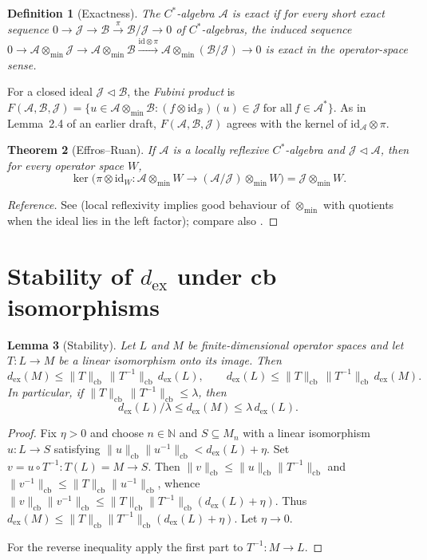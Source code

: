 \documentclass[12pt]{article}
\newtheorem{theorem}{Theorem}[section]
\newtheorem{lemma}[theorem]{Lemma}
\newtheorem{definition}[theorem]{Definition}
\newcommand{\A}{\mathcal A}
\newcommand{\B}{\mathcal B}
\newcommand{\J}{\mathcal J}
\newcommand{\id}{\mathrm{id}}
\newcommand{\otmin}{\otimes_{\min}}
\newcommand{\dex}{d_{\mathrm{ex}}}
\newcommand{\Mn}{M_n}
\begin{document}
\begin{definition}[Exactness]
The $C^*$-algebra $\A$ is \emph{exact} if for every short exact sequence
$0\to \J\to \B\overset{\pi}{\to}\B/\J\to 0$ of $C^*$-algebras, the induced sequence
$0\to \A\otmin\J\to \A\otmin\B\overset{\id\otimes\pi}{\longrightarrow}\A\otmin(\B/\J)\to 0$
is exact in the operator-space sense.
\end{definition}

For a closed ideal $\J\triangleleft \B$, the \emph{Fubini product} is
$F(\A,\B,\J)=\{u\in \A\otmin\B : (f\otimes\id_\B)(u)\in \J\ \text{for all}\ f\in \A^*\}$.
As in Lemma~2.4 of an earlier draft, $F(\A,\B,\J)$ agrees with the kernel of $\id_\A\otimes\pi$.

\begin{theorem}[Effros--Ruan]\label{thm:plr14}
If $\A$ is a locally reflexive $C^*$-algebra and $\J\triangleleft\A$, then for every operator space $W$,
\[
        \ker\bigl(\pi\otimes\id_W:\A\otmin W\to (\A/\J)\otmin W\bigr)=\J\otmin W.
\]
\end{theorem}

\begin{proof}[Reference]
See \cite[\S17]{ER} (local reflexivity implies good behaviour of $\otmin$ with quotients when the ideal lies in the left factor); compare also \cite[Ch.~9]{BO}.
\end{proof}

\section{Stability of \texorpdfstring{$\dex$}{dex} under cb isomorphisms}\label{sec:stab}

\begin{lemma}[Stability]\label{lem:stab}
Let $L$ and $M$ be finite-dimensional operator spaces and let $T:L\to M$ be a linear isomorphism onto its image.  Then
\[
        \dex(M)\le \|T\|_{\mathrm{cb}}\,\|T^{-1}\|_{\mathrm{cb}}\,\dex(L),
        \qquad
        \dex(L)\le \|T\|_{\mathrm{cb}}\,\|T^{-1}\|_{\mathrm{cb}}\,\dex(M).
\]
In particular, if $\|T\|_{\mathrm{cb}}\,\|T^{-1}\|_{\mathrm{cb}}\le \lambda$, then
\[
        \dex(L)/\lambda \le \dex(M)\le \lambda\,\dex(L).
\]
\end{lemma}

\begin{proof}
Fix $\eta>0$ and choose $n\in\mathbb N$ and $S\subseteq \Mn$ with a linear isomorphism $u:L\to S$ satisfying $\|u\|_{\mathrm{cb}}\|u^{-1}\|_{\mathrm{cb}}<\dex(L)+\eta$.  Set $v=u\circ T^{-1}:T(L)=M\to S$.  Then
$\|v\|_{\mathrm{cb}}\le \|u\|_{\mathrm{cb}}\|T^{-1}\|_{\mathrm{cb}}$ and
$\|v^{-1}\|_{\mathrm{cb}}\le \|T\|_{\mathrm{cb}}\|u^{-1}\|_{\mathrm{cb}}$, whence
$\|v\|_{\mathrm{cb}}\|v^{-1}\|_{\mathrm{cb}}\le \|T\|_{\mathrm{cb}}\|T^{-1}\|_{\mathrm{cb}}(\dex(L)+\eta)$.
Thus $\dex(M)\le \|T\|_{\mathrm{cb}}\|T^{-1}\|_{\mathrm{cb}}(\dex(L)+\eta)$.  Let $\eta\to 0$.

For the reverse inequality apply the first part to $T^{-1}:M\to L$.
\end{proof}
\end{document}

